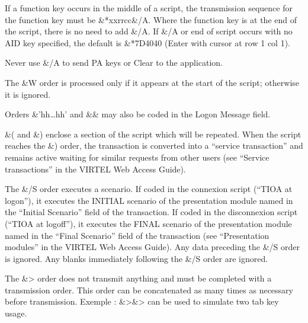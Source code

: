 \documentclass[letterpaper,10pt,english]{sphinxmanual}
\begin{document}
\begin{description}
\sphinxAtStartPar
If a function key occurs in the middle of a script, the transmission sequence for the function key must be \&*xxrrcc\&/A. Where the function key is at the end of the script, there is no need to add \&/A. If \&/A or end of script occurs with no AID key specified, the default is \&*7D4040 (Enter with cursor at row 1 col 1).

\sphinxAtStartPar
Never use \&/A to send PA keys or Clear to the application.

\sphinxAtStartPar
The \&W order is processed only if it appears at the start of the script; otherwise it is ignored.

\sphinxAtStartPar
Orders \&’hh…hh’ and \&\& may also be coded in the Logon Message field.

\sphinxAtStartPar
\&( and \&) enclose a section of the script which will be repeated. When the script reaches the \&) order, the transaction is converted into a “service transaction” and remains active waiting for similar requests from other users (see “Service transactions” in the VIRTEL Web Access Guide).

\sphinxAtStartPar
The \&/S order executes a scenario. If coded in the connexion script (“TIOA at logon”), it executes the INITIAL scenario of the presentation module named in the “Initial Scenario” field of the transaction. If coded in the disconnexion script (“TIOA at logoff”), it executes the FINAL scenario of the presentation module named in the “Final Scenario” field of the transaction (see “Presentation modules” in the VIRTEL Web Access Guide). Any data preceding the \&/S order is ignored. Any blanks immediately following the \&/S order are ignored.

\sphinxAtStartPar
The \&\textgreater{} order does not transmit anything and must be completed with a transmission order. This order can be concatenated as many times as necessary before transmission. Exemple : \&\textgreater{}\&\textgreater{} can be used to simulate two tab key usage.

\end{description}

\ignorespaces 
\end{document}
